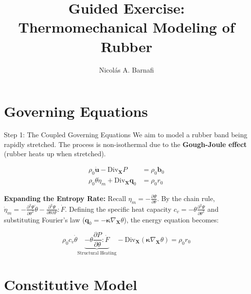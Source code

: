 \documentclass[aspectratio=169]{beamer}
\title{Guided Exercise: \\ Thermomechanical Modeling of Rubber}
\author{Nicol\'as A. Barnafi}
\date{}
\begin{document}
\begin{frame}
    \titlepage
\end{frame}

\section{Governing Equations}

\begin{frame}{Step 1: The Coupled Governing Equations}
    We aim to model a rubber band being rapidly stretched. The process is non-isothermal due to the \textbf{Gough-Joule effect} (rubber heats up when stretched). 
    
    \begin{align*}
        \rho_0 \ddot{\bm{u}} - \text{Div}_{\bm{X}} P &= \rho_0 \bm{b}_0 \tag{Linear Momentum} \\
        \rho_0 \theta \dot{\eta}_m + \text{Div}_{\bm{X}} \bm{q}_0 &= \rho_0 r_0 \tag{Entropy Balance}
    \end{align*}
    
    \textbf{Expanding the Entropy Rate:}
    Recall $\eta_m = - \frac{\partial \Psi}{\partial \theta}$. By the chain rule, $\dot{\eta}_m = - \frac{\partial^2 \Psi}{\partial \theta^2} \dot{\theta} - \frac{\partial^2 \Psi}{\partial \theta \partial F} : \dot{F}$. 
    Defining the specific heat capacity $c_v = - \theta \frac{\partial^2 \Psi}{\partial \theta^2}$ and substituting Fourier's law ($\bm{q}_0 = -\bm{\kappa} \nabla_{\bm{X}} \theta$), the energy equation becomes:
    
    $$ \rho_0 c_v \dot{\theta} \underbrace{- \theta \frac{\partial P}{\partial \theta} : \dot{F}}_{\text{Structural Heating}} - \text{Div}_{\bm{X}} (\bm{\kappa} \nabla_{\bm{X}} \theta) = \rho_0 r_0 $$
\end{frame}

\section{Constitutive Model}
\end{document}
